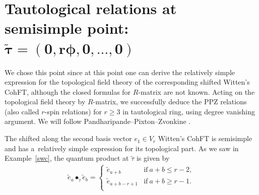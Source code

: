 \documentclass[pdftex]{sigma}
\numberwithin{equation}{section}
\begin{document}
\section[Tautological relations at semisimple point]{Tautological relations at semisimple point:\\ $\boldsymbol{\widetilde{\tau} = (0, r \phi, 0,\ldots, 0)}$}\label{tautrel}

We chose this point since at this point
one can derive the relatively simple expression for the topological field theory of the corresponding shifted Witten's CohFT, although the closed formulas for $R$-matrix are not known. Acting on the topological field theory by $R$-matrix, we successfully deduce the PPZ relations (also called $r$-spin relations)
 for $r\geq3$ in tautological ring, using degree vanishing argument. We will follow Pandharipande--Pixton--Zvonkine \cite{PPZ16}.

The shifted along the second basis vector $e_{1}\in V_r$ Witten's CohFT is
semisimple and has a~relatively simple expression for its topological part.
As we saw in Example~\ref{swc},
the quantum product at $\widetilde{\tau}$ is given by
\begin{align*}
\widetilde{e}_a \bullet_{\widetilde{\tau}}\widetilde{e}_b =
\begin{cases}
\widetilde{e}_{a+b} & \text{if} \ a+b \leq r-2 ,\\
\widetilde{e}_{a+b-r+1} & \text{if} \ a+b \geq r-1 .\\
\end{cases}
\end{align*}
\end{document}
